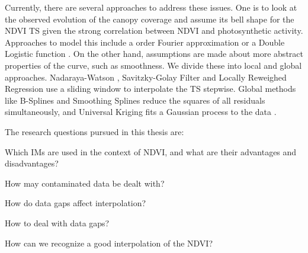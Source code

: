 Currently, there are several approaches to address these issues. One is to look at the observed evolution of the canopy coverage and assume its bell shape for the NDVI {TS} given the strong correlation between NDVI and photosynthetic activity. Approaches to model this include a  order Fourier approximation \citep{stockliEuropeanPlantPhenology2004} or a Double Logistic function \citep{beckImprovedMonitoringVegetation2006}.
On the other hand, assumptions are made about more abstract properties of the curve, such as smoothness. We divide these into local and global approaches. Nadaraya-Watson \citep{strbacEstimationEvapotrasnpirationUrban2017}, Savitzky-Golay Filter \citep{chenSimpleMethodReconstructing2004a} and Locally Reweighed Regression \citep{omoriAssessmentPaddyFields2021} use a sliding window to interpolate the {TS} stepwise. Global methods like B-Splines \citep{gurungPredictingEnhancedVegetation2009} and Smoothing Splines \citep{caiPerformanceSmoothingMethods2017} reduce the squares of all residuals simultaneously, and Universal Kriging fits a Gaussian process to the data \citep{chandolaScalableTimeSeries2010}.

\bigskip
The research questions pursued in this thesis are:
\begin{Nenumerate}
    \item Which {{IM}}s are used in the context of NDVI, and what are their advantages and disadvantages?
    \item How may contaminated data be dealt with?
    \item How do data gaps affect interpolation?
    \item How to deal with data gaps?
    \item How can we recognize a good interpolation of the NDVI?
\end{Nenumerate}
\bigskip



